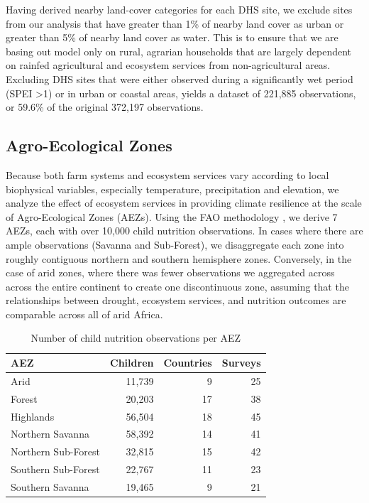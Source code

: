 \documentclass{article}
\begin{document}
Having derived nearby land-cover categories for each DHS site, we exclude sites from our analysis that have greater than 1\% of nearby land cover as urban or greater than 5\% of nearby land cover as water.  This is to ensure that we are basing out model only on rural, agrarian households that are largely dependent on rainfed agricultural and ecosystem services from non-agricultural areas.  Excluding DHS sites that were either observed during a significantly wet period (SPEI \textgreater 1) or in urban or coastal areas, yields a dataset of 221,885 observations, or 59.6\% of the original 372,197 observations.

\subsection{Agro-Ecological Zones}
Because both farm systems and ecosystem services vary according to local biophysical variables, especially temperature, precipitation and elevation, we analyze the effect of ecosystem services in providing climate resilience at the scale of Agro-Ecological Zones (AEZs).  Using the FAO methodology \cite{Fischer2006}, we derive 7 AEZs, each with over 10,000 child nutrition observations.  In cases where there are ample observations (Savanna and Sub-Forest), we disaggregate each zone into roughly contiguous northern and southern hemisphere zones.  Conversely, in the case of arid zones, where there was fewer observations we aggregated across across the entire continent to create one discontinuous zone, assuming that the relationships between drought, ecosystem services, and nutrition outcomes are comparable across all of arid Africa.

\begin{table}[h]
	\begin{center}
	\begin{tabular}{l | r | r | r}
		AEZ & Children & Countries & Surveys \\
		\hline
		Arid & 11,739 & 9 & 25\\
		Forest & 20,203 & 17 & 38 \\
		Highlands & 56,504 & 18 & 45 \\
		Northern Savanna & 58,392 & 14 & 41 \\
		Northern Sub-Forest & 32,815 & 15 & 42 \\
		Southern Sub-Forest & 22,767 & 11 & 23 \\
		Southern Savanna & 19,465 & 9 & 21 \\
	\end{tabular}
\caption{Number of child nutrition observations per AEZ}
\label{table:AEZtab}
\end{center}
\end{table}
\end{document}
